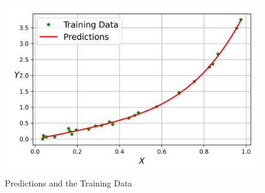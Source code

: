 \documentclass[a4paper,11pt]{article}%
\begin{document}
\begin{figure}[h]
	\centering
	\includegraphics[width=0.9\linewidth]{figures/predictions}
	\caption{Predictions and the Training Data}
\end{figure}
   
\end{document}
